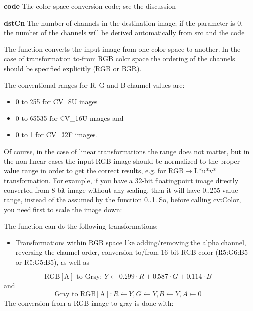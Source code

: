 \documentclass{article}
\begin{document}
\textbf{code }The color space conversion code; see the discussion

\textbf{dstCn }The number of channels in the destination image; if the
parameter is 0, the number of the channels will be derived automatically
from src and the code

The function converts the input image from one color space to another. In
the case of transformation to-from RGB color space the ordering of the
channels should be specified explicitly (RGB or BGR).

The conventional ranges for R, G and B channel values are:

\begin{itemize}
\item 0 to 255 for CV{\_}8U inages
\item 0 to 65535 for CV{\_}16U images and
\item 0 to 1 for CV{\_}32F images.
\end{itemize}

Of course, in the case of linear transformations the range does not matter,
but in the non-linear cases the input RGB image should be normalized to the
proper value range in order to get the correct results, e.g. for RGB$\to
$L*u*v* transformation. For example, if you have a 32-bit floatingpoint
image directly converted from 8-bit image without any scaling, then it will
have 0..255 value range, instead of the assumed by the function 0..1. So,
before calling cvtColor, you need first to scale the image down:

The function can do the following transformations:

\begin{itemize}
\item Transformations within RGB space like adding/removing the alpha channel, reversing the channel order, conversion to/from 16-bit RGB color (R5:G6:B5 or R5:G5:B5), as well as
\end{itemize}
\[
\mbox{RGB}\left[ \mbox{A} \right]\mbox{ to Gray: }Y\leftarrow 0.299\cdot
R+0.587\cdot G+0.114\cdot B
\]
and
\[
\mbox{Gray to RGB}\left[ \mbox{A} \right]:R\leftarrow Y,G\leftarrow
Y,B\leftarrow Y,A\leftarrow 0
\]
The conversion from a RGB image to gray is done with:
\end{document}

